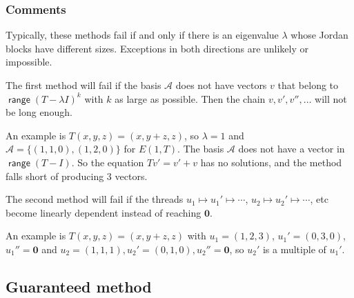 \documentclass[11pt]{article}
\newcommand{\1}{\mathbf{1}}
\newcommand{\0}{\mathbf{0}}
\newcommand{\A}{\mathcal{A}}
\DeclareMathOperator{\myrange}{\mathsf{range}}
\theoremstyle{definition}
\begin{document}
\subsubsection*{Comments}



Typically, these methods fail if and only if there is an eigenvalue $ \lambda $ whose Jordan blocks have different sizes.
Exceptions in both directions are unlikely or impossible.

The first method will fail if the basis $\A$ does not have vectors $v$ that belong to $\myrange (T-\lambda I)^k$ with $k$ as large as possible.
Then the chain $v,v',v'',\dots$ will not be long enough.

An example is $T(x,y,z)=(x,y+z,z)$, so $ \lambda=1 $ and $\A = \{ (1,1,0), (1,2,0) \}$ for $E(1,T)$.
The basis $\A$ does not have a vector in $\myrange(T-I)$.
So the equation $Tv' = v' + v$ has no solutions, and the method falls short of producing 3 vectors.

The second method will fail if the threads
$ u_1 \mapsto u_1' \mapsto \cdots $,
$ u_2 \mapsto u_2' \mapsto \cdots $, etc become linearly dependent instead of reaching $ \0 $.

An example is $T(x,y,z)=(x,y+z,z)$ with $ u_1 = (1,2,3) $, $ u_1'=(0,3,0) $, $ u_1''=\0 $ and $ u_2=(1,1,1), u_2'=(0,1,0), u_2''=\0 $, so $ u_2' $ is a multiple of $ u_1' $.



\clearpage

\subsection*{Guaranteed method}
\end{document}
